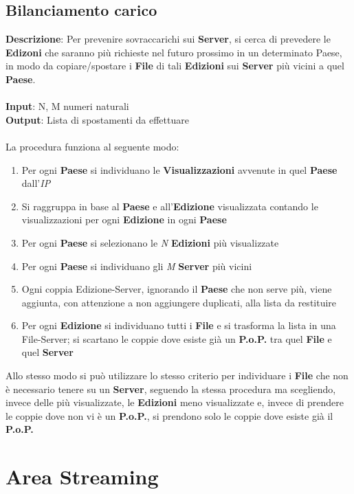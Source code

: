 \documentclass{article}
\begin{document}
\subsection{Bilanciamento carico}
\textbf{Descrizione}: Per prevenire sovraccarichi sui \textbf{Server}, si cerca di prevedere le \textbf{Edizoni} che saranno più richieste nel futuro prossimo in un determinato Paese, in modo da copiare/spostare i \textbf{File} di tali \textbf{Edizioni} sui \textbf{Server} più vicini a quel \textbf{Paese}. \\ \\ 
\textbf{Input}: N, M numeri naturali\\
\textbf{Output}: Lista di spostamenti da effettuare \\ \\
La procedura funziona al seguente modo: \\
\begin{enumerate}
    \item Per ogni \textbf{Paese} si individuano le \textbf{Visualizzazioni} avvenute in quel \textbf{Paese} dall'\textit{IP}
    \item Si raggruppa in base al \textbf{Paese} e all'\textbf{Edizione} visualizzata contando le visualizzazioni per ogni \textbf{Edizione} in ogni \textbf{Paese}
    \item Per ogni \textbf{Paese} si selezionano le \textit{N} \textbf{Edizioni} più visualizzate
    \item Per ogni \textbf{Paese} si individuano gli \textit{M} \textbf{Server} più vicini
    \item Ogni coppia Edizione-Server, ignorando il \textbf{Paese} che non serve più, viene aggiunta, con attenzione a non aggiungere duplicati, alla lista da restituire
    \item Per ogni \textbf{Edizione} si individuano tutti i \textbf{File} e si trasforma la lista in una File-Server; si scartano le coppie dove esiste già un \textbf{P.o.P.} tra quel \textbf{File} e quel \textbf{Server}
\end{enumerate}
Allo stesso modo si può utilizzare lo stesso criterio per individuare i \textbf{File} che non è necessario tenere su un \textbf{Server}, seguendo la stessa procedura ma scegliendo, invece delle più visualizzate, le \textbf{Edizioni} meno visualizzate e, invece di prendere le coppie dove non vi è un \textbf{P.o.P.}, si prendono solo le coppie dove esiste già il \textbf{P.o.P.} \\
\section{Area Streaming} 
\end{document}
